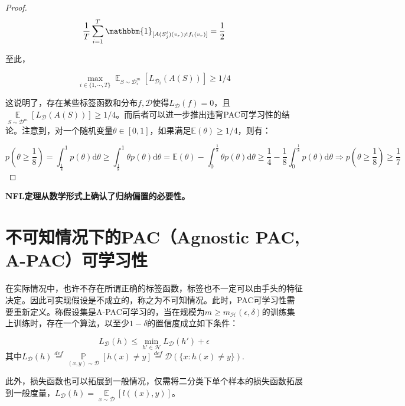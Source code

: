 \documentclass{article}
\newtheorem*{proof}{Proof}
\begin{document}
\begin{proof}
	\begin{equation*}
	\frac{1}{T}\sum_{i=1}^T\mathbbm{1}_{[A(S_j^i)(v_r)\neq f_i(v_r)]}=\frac{1}{2}
	\end{equation*}

	至此，

	\begin{equation*}
	\max_{i\in\{1,\cdots,T\}}\mathop{\mathbb{E}}_{S\sim\mathcal{D}_i^m}[L_{\mathcal{D}_i}(A(S))]\geq 1/4
	\end{equation*}

	这说明了，存在某些标签函数和分布$f,\mathcal{D}$使得$L_\mathcal{D}(f)=0$，且$\mathop{\mathbb{E}}\limits_{S\sim\mathcal{D}^m}[L_\mathcal{D}(A(S))]\geq 1/4$。而后者可以进一步推出违背PAC可学习性的结论。注意到，对一个随机变量$\theta\in[0,1]$，如果满足$\mathbb{E}(\theta)\geq 1/4$，则有：
	
	\begin{equation*}
	p\left(\theta\geq\frac{1}{8}\right)=\int_\frac{1}{8}^1 p(\theta) \mathrm{d}\theta \geq\int_\frac{1}{8}^1 \theta p(\theta) \mathrm{d}\theta=\mathbb{E}(\theta)-\int_0^\frac{1}{8}\theta p(\theta)\mathrm{d}\theta \geq\frac{1}{4}-\frac{1}{8}\int_0^\frac{1}{8} p(\theta)\mathrm{d}\theta \Rightarrow p \left(\theta\geq\frac{1}{8}\right)\geq \frac{1}{7}
	\end{equation*}
	\end{proof}

	\textbf{NFL定理从数学形式上确认了归纳偏置的必要性。}

\section{不可知情况下的PAC（Agnostic PAC, A-PAC）可学习性}

	在实际情况中，也许不存在所谓正确的标签函数，标签也不一定可以由手头的特征决定。因此可实现假设是不成立的，称之为不可知情况。此时，PAC可学习性需要重新定义。称假设集是A-PAC可学习的，当在规模为$m\geq m_\mathcal{H}(\epsilon,\delta)$的训练集上训练时，存在一个算法，以至少$1-\delta$的置信度成立如下条件：
	
	\begin{equation*}
	L_\mathcal{D}(h)\leq\min\limits_{h'\in\mathcal{H}}L_\mathcal{D}(h')+\epsilon
	\end{equation*}
其中$L_\mathcal{D}(h)\overset{def}{=}\mathop{\mathbb{P}}\limits_{(x,y)\sim\mathcal{D}}[h(x)\neq y]\overset{def}{=}\mathcal{D}(\{x:h(x)\neq y\})$.

	此外，损失函数也可以拓展到一般情况，仅需将二分类下单个样本的损失函数拓展到一般度量，$L_\mathcal{D}(h)=\mathop{\mathbb{E}}\limits_{x\sim\mathcal{D}}[l((x),y)]$。
	
\end{document}
